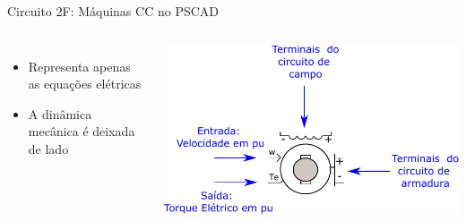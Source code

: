 \begin{frame}{Circuito 2F: Máquinas CC no PSCAD}
\centering


\begin{columns}

\centering

\begin{itemize}
\item Representa apenas as equações elétricas 
\vspace*{2cm}
\item A dinâmica mecânica é deixada de lado
\end{itemize}

\centering


\includegraphics[width=0.95\linewidth]{./figuras/Segundo-Circuito/SEMf_maq_cc_pascad}

\end{columns}
\end{frame}




